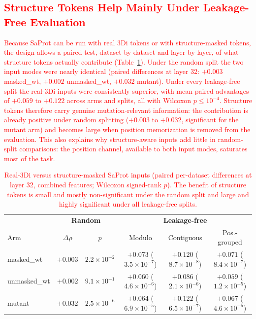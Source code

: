 \documentclass[11pt,a4paper]{article}
\newcommand{\rev}[1]{\textcolor{red}{#1}}
\begin{document}
\textcolor{red}{\subsection{\rev{Structure Tokens Help Mainly Under Leakage-Free Evaluation}}}

\textcolor{red}{\rev{Because SaProt can be run with real 3Di tokens or with structure-masked
tokens, the design allows a paired test, dataset by dataset and layer by
layer, of what structure tokens actually contribute (Table~\ref{tab:3di}). Under the
random split the two input modes were nearly identical (paired differences at layer
32: $+0.003$ masked\_wt, $+0.002$ unmasked\_wt, $+0.032$ mutant). Under every
leakage-free split the real-3Di inputs were consistently superior, with mean paired
advantages of $+0.059$ to $+0.122$ across arms and splits, all with Wilcoxon
$p \leq 10^{-4}$. Structure tokens therefore carry genuine mutation-relevant
information: the contribution is already positive under random splitting
($+0.003$ to $+0.032$, significant for the mutant arm) and becomes large when
position memorization is removed from the evaluation. This also
explains why structure-aware inputs add little in random-split comparisons:
the position channel, available to both input modes, saturates most of the
task.}}

\begin{table}[ht]
\centering
\caption{\rev{Real-3Di versus structure-masked SaProt inputs (paired per-dataset
differences at layer 32, combined features; Wilcoxon signed-rank $p$). The benefit of
structure tokens is small and mostly non-significant under the random split and
large and highly significant under all leakage-free splits.}}
\label{tab:3di}
\begin{tabular}{lcc|ccc}
\toprule
& \multicolumn{2}{c|}{\textbf{Random}} & \multicolumn{3}{c}{\textbf{Leakage-free}} \\
Arm & $\Delta\rho$ & $p$ & Modulo & Contiguous & Pos.-grouped \\
\midrule
masked\_wt   & $+0.003$ & $2.2 \times 10^{-2}$ & $+0.073$ ($3.5 \times 10^{-7}$) & $+0.120$ ($8.7 \times 10^{-8}$) & $+0.071$ ($8.4 \times 10^{-7}$) \\
unmasked\_wt & $+0.002$ & $9.1 \times 10^{-1}$ & $+0.060$ ($4.6 \times 10^{-6}$) & $+0.086$ ($2.1 \times 10^{-6}$) & $+0.059$ ($1.2 \times 10^{-5}$) \\
mutant       & $+0.032$ & $2.5 \times 10^{-6}$ & $+0.064$ ($6.9 \times 10^{-5}$) & $+0.122$ ($6.5 \times 10^{-7}$) & $+0.067$ ($4.6 \times 10^{-5}$) \\
\bottomrule
\end{tabular}
\end{table}
\end{document}
